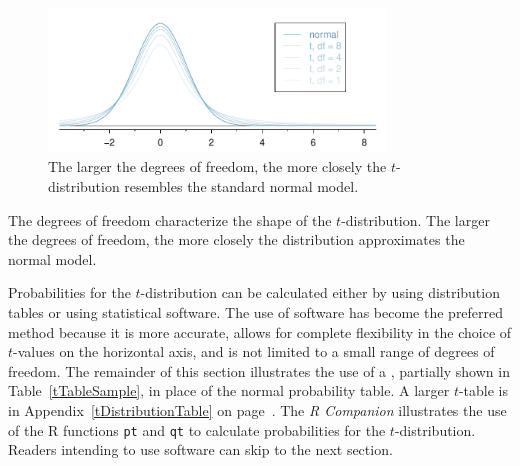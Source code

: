 \begin{figure}
\centering
\includegraphics[width=0.8\textwidth]{ch_inference_for_means_oi_biostat/figures/tDistConvergeToNormalDist/tDistConvergeToNormalDist}
\caption{The larger the degrees of freedom, the more closely the $t$-distribution resembles the standard normal model.}
\label{tDistConvergeToNormalDist}
\end{figure}

\begin{termBox}{
The degrees of freedom characterize the shape of the $t$-distribution. The larger the degrees of freedom, the more closely the distribution approximates the normal model.}
\end{termBox}

Probabilities for the $t$-distribution can be calculated either by using distribution tables or using statistical software. The use of software has become the preferred method because it is more accurate, allows for complete flexibility in the choice of $t$-values on the horizontal axis, and is not limited to a small range of degrees of freedom. The remainder of this section illustrates the use of a , partially shown in Table~\ref{tTableSample}, in place of the normal probability table. A larger $t$-table is in Appendix~\ref{tDistributionTable} on page~\pageref{tDistributionTable}.  The \textsl{R Companion} illustrates the use of the \textsf{R} functions \texttt{pt} and \texttt{qt} to calculate probabilities for the $t$-distribution.  Readers intending to use software can skip to the next section.


